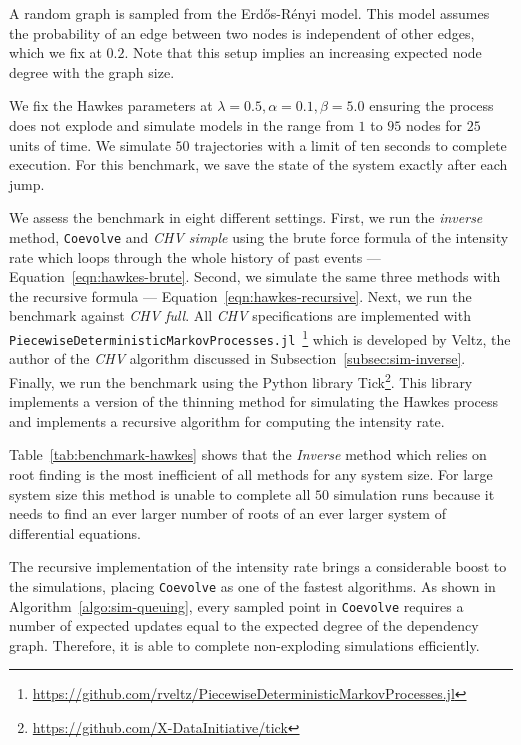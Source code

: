 \documentclass{juliacon}
\numberwithin{equation}{section}
\begin{document}
A random graph is sampled from the Erd\H{o}s-Rényi model. This model assumes the probability of an edge between two nodes is independent of other edges, which we fix at \( 0.2 \). Note that this setup implies an increasing expected node degree with the graph size.

We fix the Hawkes parameters at \( \lambda = 0.5 , \alpha = 0.1 , \beta = 5.0 \) ensuring the process does not explode and simulate models in the range from \( 1 \) to \( 95 \) nodes for \( 25 \) units of time. We simulate \( 50 \) trajectories with a limit of ten seconds to complete execution. For this benchmark, we save the state of the system exactly after each jump.

We assess the benchmark in eight different settings. First, we run the \textit{inverse} method, \texttt{Coevolve} and \textit{CHV simple} using the brute force formula of the intensity rate which loops through the whole history of past events --- Equation~\ref{eqn:hawkes-brute}. Second, we simulate the same three methods with the recursive formula --- Equation~\ref{eqn:hawkes-recursive}. Next, we run the benchmark against \textit{CHV full}. All \textit{CHV} specifications are implemented with \texttt{PiecewiseDeterministicMarkovProcesses.jl}~\footnote{\url{https://github.com/rveltz/PiecewiseDeterministicMarkovProcesses.jl}} which is developed by Veltz, the author of the \textit{CHV} algorithm discussed in Subsection~\ref{subsec:sim-inverse}. Finally, we run the benchmark using the Python library Tick\footnote{\url{https://github.com/X-DataInitiative/tick}}. This library implements a version of the thinning method for simulating the Hawkes process and implements a recursive algorithm for computing the intensity rate.

Table~\ref{tab:benchmark-hawkes} shows that the \textit{Inverse} method which relies on root finding is the most inefficient of all methods for any system size. For large system size this method is unable to complete all \( 50 \) simulation runs because it needs to find an ever larger number of roots of an ever larger system of differential equations.

The recursive implementation of the intensity rate brings a considerable boost to the simulations, placing \texttt{Coevolve} as one of the fastest algorithms. As shown in Algorithm~\ref{algo:sim-queuing}, every sampled point in \texttt{Coevolve} requires a number of expected updates equal to the expected degree of the dependency graph. Therefore, it is able to complete non-exploding simulations efficiently.
\end{document}
